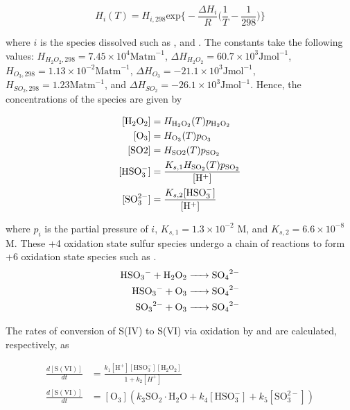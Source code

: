 \begin{equation}
    H_i(T) = H_{i,298}\mathrm{exp} \bigg\{ -\frac{\Delta H_i}{R} \bigg( \frac{1}{T} - \frac{1}{298} \bigg) \bigg\}
\end{equation}

where $i$ is the species dissolved such as ,  and .  The constants take the following values: 
$H_{H_2O_2, 298}=7.45 \times 10^4 \mathrm{Matm}^{-1}$, 
$\Delta H_{H_2O_2} = 60.7 \times 10^3 \mathrm{Jmol}^{-1}$, 
$H_{O_3, 298}=1.13 \times 10^{-2} \mathrm{Matm}^{-1}$, 
$\Delta H_{O_3} = -21.1 \times 10^3 \mathrm{Jmol}^{-1}$, 
$H_{SO_2, 298}=1.23 \mathrm{Matm}^{-1}$, and
$\Delta H_{SO_2}=-26.1 \times 10^3 \mathrm{Jmol}^{-1}$. 
Hence, the concentrations of the species are given by

\begin{equation}
    \begin{aligned}
        \relax[\mathrm{H_2O_2}] & = H_{\mathrm{H_2O_2}}(T)p_{\mathrm{H_2O_2}} \\
        [\mathrm{O_3}] & = H_{\mathrm{O_3}}(T)p_{\mathrm{O_3}} \\
        [\mathrm{SO2}] & = H_{\mathrm{SO2}}(T)p_{\mathrm{SO_2}} \\
        [\mathrm{HSO_3^-}] & = \frac{K_{s,1}H_{\mathrm{SO_2}}(T)p_{\mathrm{SO_2}}}{[\mathrm{H^+}]}\\
        [\mathrm{SO_3^{2-}}] & = \frac{K_{s,2}[\mathrm{HSO_3^-}]}{[\mathrm{H^+}]}\\
    \end{aligned}
\end{equation}

where $p_i$ is the partial pressure of $i$,  
$K_{s,1} = 1.3 \times 10^{-2}$ M, and 
$K_{s,2} = 6.6 \times 10^{-8}$ M.  
These +4 oxidation state sulfur species undergo a chain of reactions to form +6 oxidation state species such as . 
\begin{align}
    \ce{HSO3- + H2O2 &-> SO4^2-} \\
    \ce{HSO3- + O3 &-> SO4^2-} \\
    \ce{SO3^2- + O3 &-> SO4^2-} 
\end{align}

The rates of conversion of S(IV) to S(VI) via oxidation by  and  are calculated, respectively, as

\begin{equation}
    \begin{aligned}
        \frac{d[\mathrm{S(VI)}]}{dt} & = \frac{k_1 \mathrm{[H^+][HSO_3^-][H_2O_2]}}{1+k_2[H^+]} \\
        \frac{d[\mathrm{S(VI)}]}{dt} & = [\mathrm{O_3}]( k_3 \mathrm{SO_2 \cdot H_2O} + k_4 [\mathrm{HSO_3^-}] + k_5 [\mathrm{SO_3^{2-}}]) \\
    \end{aligned}
\end{equation}

